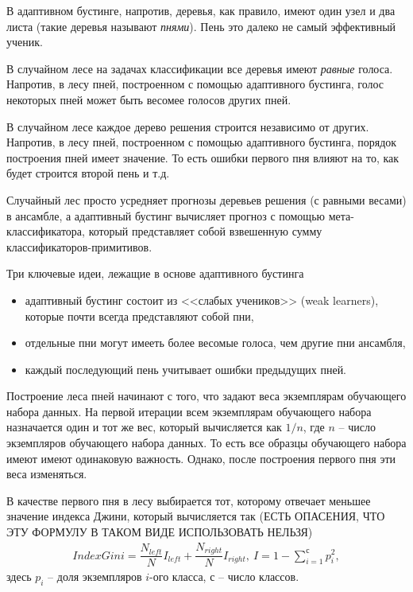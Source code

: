 \documentclass[%
	11pt,
	a4paper,
	utf8,
		]{article}
\begin{document}
В адаптивном бустинге, напротив, деревья, как правило, имеют один узел и два листа (такие деревья называют \emph{пнями}). Пень это далеко не самый эффективный ученик.

В случайном лесе на задачах классификации все деревья имеют \emph{равные} голоса. Напротив, в лесу пней, построенном с помощью адаптивного бустинга, голос некоторых пней может быть весомее голосов других пней.

В случайном лесе каждое дерево решения строится независимо от других. Напротив, в лесу пней, построенном с помощью адаптивного бустинга, порядок построения пней имеет значение. То есть ошибки первого пня влияют на то, как будет строится второй пень и т.д.

Случайный лес просто усредняет прогнозы деревьев решения (с равными весами) в ансамбле, а адаптивный бустинг вычисляет прогноз с помощью мета-классификатора, который представляет собой взвешенную сумму классификаторов-примитивов.

Три ключевые идеи, лежащие в основе адаптивного бустинга
\begin{itemize}
	\item адаптивный бустинг состоит из <<слабых учеников>> (weak learners), которые почти всегда представляют собой пни,
	
	\item отдельные пни могут имееть более весомые голоса, чем другие пни ансамбля,
	
	\item каждый последующий пень учитывает ошибки предыдущих пней.
\end{itemize}

Построение леса пней начинают с того, что задают веса экземплярам обучающего набора данных. На первой итерации всем экземплярам обучающего набора назначается один и тот же вес, который вычисляется как $ 1/n $, где $ n $ -- число экземпляров обучающего набора данных. То есть все образцы обучающего набора имеют имеют одинаковую важность. Однако, после построения первого пня эти веса изменяться.

В качестве первого пня в лесу выбирается тот, которому отвечает меньшее значение индекса Джини, который вычисляется так (ЕСТЬ ОПАСЕНИЯ, ЧТО ЭТУ ФОРМУЛУ В ТАКОМ ВИДЕ ИСПОЛЬЗОВАТЬ НЕЛЬЗЯ)
\begin{align*}
	Index Gini = \dfrac{N_{left}}{N} I_{left} + \dfrac{N_{right}}{N} I_{right},\ I = 1 - \sum_{i=1}^{с} p_i^2,
\end{align*}
здесь $ p_i $ -- доля экземпляров $ i $-ого класса, $ с $ -- число классов.
\end{document}
